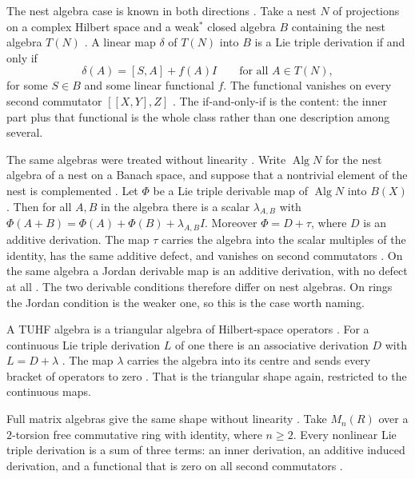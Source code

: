 The nest algebra case is known in both directions \cite[Theorem~1.1,
p.~882]{Lu2007LieTripleNest}. Take a nest $N$ of projections on a complex
Hilbert space and a weak$^{\ast}$ closed algebra $B$ containing the nest
algebra $T(N)$ \cite[Theorem~1.1, p.~882]{Lu2007LieTripleNest}. A linear map
$\delta$ of $T(N)$ into $B$ is a Lie triple derivation if and only if
\[
  \delta(A) = [S,A] + f(A)I \qquad \text{for all } A \in T(N),
\]
for some $S \in B$ and some linear functional $f$. The
functional vanishes
on every second commutator $[[X,Y],Z]$ \cite[Theorem~1.1,
p.~882]{Lu2007LieTripleNest}. The if-and-only-if is the content: the inner
part plus that functional is the whole class rather than one description among
several.

The same algebras were treated without linearity \cite[Abstract,
p.~653]{LiFang2013LieTripleNest}. Write $\operatorname{Alg}N$ for the nest
algebra of a nest on a Banach space, and suppose that a nontrivial element of
the nest is complemented \cite[Abstract, p.~653]{LiFang2013LieTripleNest}. Let
$\Phi$ be a Lie triple derivable map of $\operatorname{Alg}N$ into $B(X)$.
Then for all $A,B$ in the algebra there is a scalar $\lambda_{A,B}$ with
$\Phi(A+B)=\Phi(A)+\Phi(B)+\lambda_{A,B}I$. Moreover $\Phi = D + \tau$, where
$D$ is an additive derivation. The map $\tau$ carries the algebra into the
scalar multiples of the identity, has the same additive defect, and vanishes
on second commutators \cite[Abstract, p.~653]{LiFang2013LieTripleNest}. On the
same algebra a Jordan derivable map is an additive derivation, with no defect
at all \cite[Abstract, p.~653]{LiFang2013LieTripleNest}. The two derivable
conditions therefore differ on nest algebras. On rings the Jordan condition is
the weaker one, so this is the case worth naming.

A TUHF algebra is a triangular algebra of Hilbert-space operators
\cite[Abstract, p.~399]{JiWang2005TUHF}. For a continuous Lie triple
derivation $L$ of one there is an associative derivation $D$ with $L = D +
\lambda$ \cite[Abstract, p.~399]{JiWang2005TUHF}. The map $\lambda$ carries
the algebra into its centre and sends every bracket of operators to zero
\cite[Abstract, p.~399]{JiWang2005TUHF}. That is the triangular shape again,
restricted to the continuous maps.

Full matrix algebras give the same shape without linearity \cite[Abstract,
p.~77]{XiaoWei2013NonlinearLieTriple}. Take $M_{n}(R)$ over a $2$-torsion free
commutative ring with identity, where $n\ge 2$. Every nonlinear Lie triple
derivation is a sum of three terms: an inner derivation, an additive induced
derivation, and a functional that is zero on all second commutators
\cite[Abstract, p.~77]{XiaoWei2013NonlinearLieTriple}.

